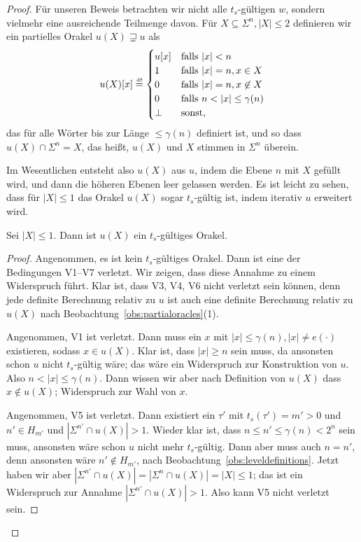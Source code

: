 \begin{proof}
Für unseren Beweis betrachten wir nicht alle $t_{s}$-gültigen $w$, sondern vielmehr eine ausreichende Teilmenge davon.
Für $X \subseteq \Sigma^n, |X|\leq 2$ definieren wir ein partielles Orakel $u(X)\sqsupsetneq u$ als
\[
    u(X)[x] \defeq \begin{cases} u[x] & \text{falls $|x|< n$}\\
    1 & \text{falls $|x|=n, x\in X$}\\
    0 & \text{falls $|x|=n, x\not\in X$}\\
    0 & \text{falls $n<|x|\leq \gamma(n)$} \\ \bot & \text{sonst}, \end{cases}
\]
das für alle Wörter bis zur Länge $\leq\gamma(n)$ definiert ist, und so dass $u(X) \cap \Sigma^n = X$, das heißt, $u(X)$ und $X$ stimmen in $\Sigma^n$ überein.

Im Wesentlichen entsteht also $u(X)$ aus $u$, indem die Ebene $n$ mit $X$ gefüllt wird, und dann die höheren Ebenen leer gelassen werden.
Es ist leicht zu sehen, dass für $|X|\leq 1$ das Orakel $u(X)$ sogar $t_{s}$-gültig ist, indem iterativ $u$ erweitert wird.

\begin{claim}\label{claim:myoracle-validty-leq1}
    Sei $|X|\leq 1$. Dann ist $u(X)$ ein $t_{s}$-gültiges Orakel.
\end{claim}
\begin{proof}
    Angenommen, es ist kein $t_{s}$-gültiges Orakel. Dann ist eine der Bedingungen V1–V7 verletzt. Wir zeigen, dass diese Annahme zu einem Widerspruch führt.
    Klar ist, dass V3, V4, V6 nicht verletzt sein können, denn jede definite Berechnung relativ zu $u$ ist auch eine definite Berechnung relativ zu $u(X)$ nach Beobachtung~\ref{obs:partialoracles}(1).

    Angenommen, V1 ist verletzt. Dann muss ein $x$ mit $|x|\leq \gamma(n), |x|\neq e(\cdot)$ existieren, sodass $x\in u(X)$.
    Klar ist, dass $|x|\geq n$ sein muss, da ansonsten schon $u$ nicht $t_{s}$-gültig wäre; das wäre ein Widerspruch zur Konstruktion von $u$.
    Also $n<|x|\leq \gamma(n)$. Dann wissen wir aber nach Definition von $u(X)$ dass $x\not\in u(X)$; Widerspruch zur Wahl von $x$.

    Angenommen, V5 ist verletzt. Dann existiert ein $\tau'$ mit $t_{s}(\tau')=m'>0$ und $n'\in H_{m'}$ und $|\Sigma^{n'}\cap u(X)|>1$. Wieder klar ist, dass $n\leq n'\leq\gamma(n)<2^n$ sein muss, ansonsten wäre schon $u$ nicht mehr $t_{s}$-gültig.
    Dann aber muss auch $n=n'$, denn ansonsten wäre $n'\not\in H_{m'}$, nach Beobachtung~\ref{obs:leveldefinitions}.
    Jetzt haben wir aber $|\Sigma^{n'}\cap u(X)|=|\Sigma^n\cap u(X)| = |X|\leq 1$; das ist ein Widerspruch zur Annahme $|\Sigma^{n'}\cap u(X)|>1$. Also kann V5 nicht verletzt sein. 


\end{proof}
\end{proof}
